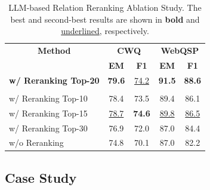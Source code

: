 \begin{table}[htbp]
\centering
\small
\setlength{\tabcolsep}{16pt}
\renewcommand{\arraystretch}{1.1}
\caption{LLM-based Relation Reranking Ablation Study. The best and second-best results are shown in \textbf{bold} and \underline{underlined}, respectively.}
\label{tab:reranking_ablation}
\begin{tabular}{l|cc|cc}
\toprule
\multicolumn{1}{c|}{\textbf{Method}}
& \multicolumn{2}{c|}{\textbf{CWQ}}  
& \multicolumn{2}{c}{\textbf{WebQSP}} \\
& \textbf{EM} & \textbf{F1}  
& \textbf{EM} & \textbf{F1} \\
\midrule
\midrule
\rowcolor{blue!8}
\textbf{w/ Reranking Top-20}      
& \textbf{79.6} & \underline{74.2} 
& \textbf{91.5} & \textbf{88.6} \\
\midrule
\rowcolor{gray!15}
\multicolumn{5}{c}{\textit{Ablations}} \\
\midrule
w/ Reranking Top-10    & 78.4 & 73.5 & 89.4 & 86.1 \\
w/ Reranking Top-15    & \underline{78.7} & \textbf{74.6} & \underline{89.8} & \underline{86.5} \\
w/ Reranking Top-30    & 76.9 & 72.0 & 87.0 & 84.4 \\
w/o Reranking          & 74.8 & 70.1 & 87.0 & 82.2 \\
\bottomrule
\end{tabular}
\end{table}



\subsection{Case Study}

\label{app:case_study}




